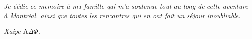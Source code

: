 
\begin{flushright}
	\itshape
	Je dédie ce mémoire à ma famille qui m'a soutenue tout au long de cette aventure à Montréal, ainsi que toutes les rencontres qui en ont fait un séjour inoubliable.
\end{flushright}

\vfill

\begin{flushright}
	\textit{Xaipe} $\text{A}\Delta\Phi$.
\end{flushright}
